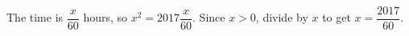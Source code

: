 The time is $\dfrac{x}{60}$ hours, so $ x^2=2017\dfrac{x}{60}$. Since $ x>0 $, divide by $ x $ to get $\boxed{x=\dfrac{2017}{60}}$.
